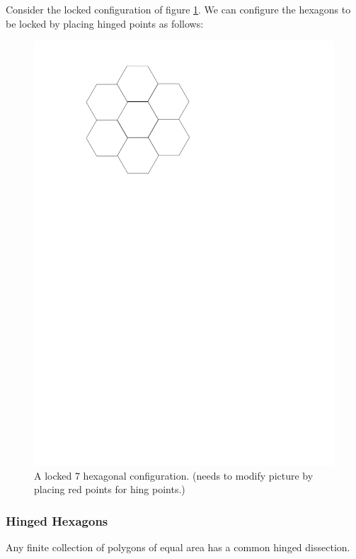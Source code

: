 Consider the locked configuration of figure \ref{figure:7hexLocked}.  We can
 configure the hexagons to be locked by placing hinged points as follows:
\begin{figure}[!ht]
\begin{center}
\includegraphics[scale=.33]{graphics/7hexLocked.pdf}
\caption{A locked 7 hexagonal configuration.  (needs to modify picture by
placing red points for hing points.)}
\label{figure:7hexLocked}
\end{center} 
\end{figure}

\subsubsection{Hinged Hexagons}
\begin{thm}[]\label{thm}
Any finite collection of polygons of equal area has a common hinged dissection.
\cite{abbott2012hinged}
\end{thm}
